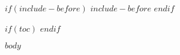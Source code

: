 \documentclass[oneside,a4paper,final,14pt]{extreport}
\begin{document}
$if(include-before)$
    $include-before$
$endif$

$if(toc)$
    \tableofcontents
    \clearpage
$endif$

$body$
\end{document}
